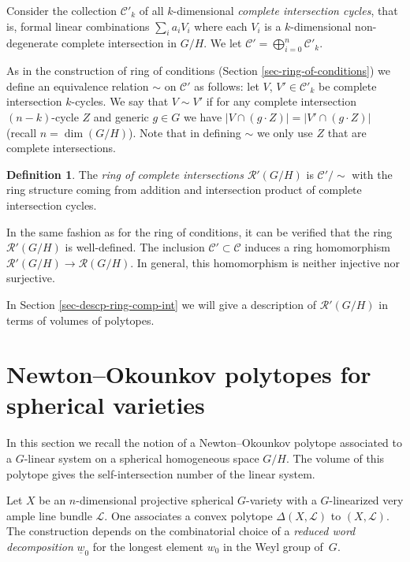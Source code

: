\documentclass[pdftex]{sigma}
\def \w{{\underline{w}_0}}
\numberwithin{equation}{section}
\theoremstyle{definition}
\newtheorem{Def}[Th]{Definition}
\begin{document}
Consider the collection $\mathcal{C}'_k$ of all $k$-dimensional {\it complete intersection cycles}, that is, formal linear combinations $\sum_i a_i V_i$ where each $V_i$ is a $k$-dimensional non-degenerate complete intersection in $G/H$. We let $\mathcal{C}' = \bigoplus_{i=0}^n \mathcal{C}'_k$.

As in the construction of ring of conditions (Section \ref{sec-ring-of-conditions}) we define an equivalence relation $\sim$ on $\mathcal{C}'$ as follows: let $V$, $V' \in \mathcal{C}'_k$ be complete intersection $k$-cycles. We say that $V \sim V'$ if for any complete intersection $(n-k)$-cycle $Z$ and generic $g \in G$ we have
$|V \cap (g \cdot Z)| = |V' \cap (g \cdot Z)|$ (recall $n = \dim(G/H)$).
Note that in defining $\sim$ we only use $Z$ that are complete intersections.

\begin{Def} \label{def-ring-of-complete-intersections}
The {\it ring of complete intersections $\mathcal{R}'(G/H)$} is
$\mathcal{C}' /{\sim}$ with the ring structure coming from addition and intersection product of complete intersection cycles.
\end{Def}

In the same fashion as for the ring of conditions, it can be verified that the ring $\mathcal{R}'(G/H)$ is well-defined.
The inclusion $\mathcal{C}' \subset \mathcal{C}$ induces a ring homomorphism $\mathcal{R}'(G/H) \to \mathcal{R}(G/H)$. In general, this homomorphism is neither injective nor surjective.

In Section \ref{sec-descp-ring-comp-int} we will give a description of $\mathcal{R}'(G/H)$ in terms of volumes of polytopes.

\section{Newton--Okounkov polytopes for spherical varieties} \label{sec-NO-polytope-sph-var}
In this section we recall the notion of a Newton--Okounkov polytope associated to a $G$-linear system on a spherical homogeneous space $G/H$. The volume of this polytope gives the self-intersection number of the linear system.

Let $X$ be an $n$-dimensional projective spherical $G$-variety with a $G$-linearized very ample line bundle ${\mathcal L}$. One associates a convex polytope $\Delta(X, {\mathcal L})$ to $(X, {\mathcal L})$. The construction depends on the combinatorial choice of a {\it reduced word decomposition} $\w$ for the longest element $w_0$ in the Weyl group of~$G$.
\end{document}
